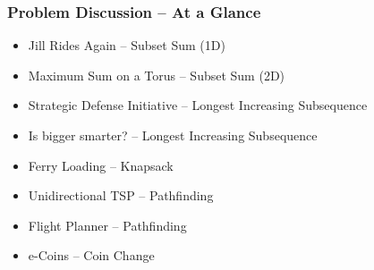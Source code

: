 

\begin{frame}
   \frametitle{Problem Discussion -- At a Glance}
   \begin{itemize}
   \item Jill Rides Again -- Subset Sum (1D)
   \item Maximum Sum on a Torus -- Subset Sum (2D)
   \item Strategic Defense Initiative -- Longest Increasing Subsequence
   \item Is bigger smarter? -- Longest Increasing Subsequence
   \item Ferry Loading -- Knapsack
   \item Unidirectional TSP -- Pathfinding
   \item Flight Planner -- Pathfinding
   \item e-Coins -- Coin Change
   \end{itemize}
\end{frame}
